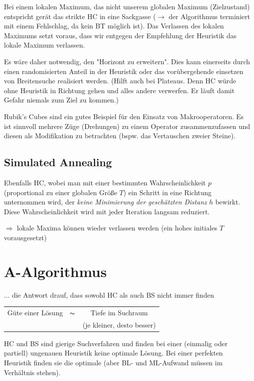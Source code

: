 \documentclass[runningheads,deutsch]{llncs}
\begin{document}
Bei einem lokalen Maximum, das nicht unserem globalen Maximum (Zielzustand) entspricht gerät das strikte HC in eine Sackgasse ($\rightarrow$ der Algorithmus terminiert mit einem Fehlschlag, da kein BT möglich ist). Das Verlassen des lokalen Maximums setzt voraus, dass wir entgegen der Empfehlung der Heuristik das lokale Maximum verlassen.

Es wäre daher notwendig, den "Horizont zu erweitern". Dies kann einerseits durch einen randomisierten Anteil in der Heuristik oder das vorübergehende einsetzen von Breitensuche realisiert werden. (Hilft auch bei Plateaus. Denn HC würde ohne Heuristik in  Richtung gehen und alles andere verwerfen. Er läuft damit Gefahr niemals zum Ziel zu kommen.)

Rubik's Cubes sind ein gutes Beispiel für den Einsatz von Makrooperatoren. Es ist sinnvoll mehrere Züge (Drehungen) zu einem Operator zusammenzufassen und diesen als Modifikation zu betrachten (bspw. das Vertauschen zweier Steine).

\subsection{Simulated Annealing}

Ebenfalls HC, wobei man mit einer bestimmten Wahrscheinlichkeit $p$ (proportional zu einer globalen Größe $T$) ein Schritt in eine Richtung unternommen wird, der \textit{keine Minimierung der geschätzten Distanz} $h$ bewirkt. Diese Wahrscheinlichkeit wird mit jeder Iteration langsam reduziert.

$\Rightarrow$ lokale Maxima können wieder verlassen werden (ein hohes initiales $T$ vorausgesetzt)

\section{A-Algorithmus}

$\dots$ die Antwort drauf, dass sowohl HC als auch BS nicht immer  finden

\begin{center}
    \begin{tabular}{c c c}
        \huge Güte einer Lösung & \huge $\thicksim $ & \huge Tiefe im Suchraum \\
        & & (je kleiner, desto besser)        
    \end{tabular}
\end{center}

HC und BS sind gierige Suchverfahren und finden bei einer (einmalig oder partiell) ungenauen Heuristik keine optimale Lösung. Bei einer perfekten Heuristik finden sie die optimale (aber BL- und ML-Aufwand müssen im Verhältnis stehen). 
\end{document}
